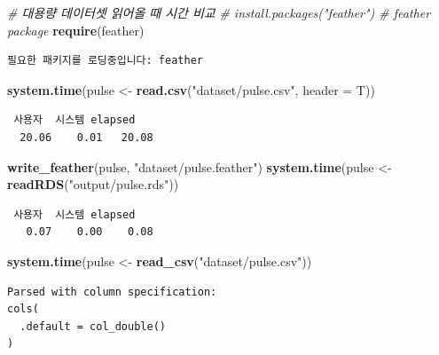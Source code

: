 \documentclass[
  11pt,
]{krantz}
\newenvironment{Shaded}{\begin{snugshade}}{\end{snugshade}}
\newcommand{\CommentTok}[1]{\textcolor[rgb]{0.37,0.37,0.37}{\textit{#1}}}
\newcommand{\DataTypeTok}[1]{\textcolor[rgb]{0.27,0.27,0.27}{#1}}
\newcommand{\KeywordTok}[1]{\textcolor[rgb]{0.27,0.27,0.27}{\textbf{#1}}}
\newcommand{\NormalTok}[1]{#1}
\newcommand{\StringTok}[1]{\textcolor[rgb]{0.5,0.5,0.5}{#1}}
\begin{document}
\begin{Shaded}
\begin{Highlighting}[]
\CommentTok{# 대용량 데이터셋 읽어올 때 시간 비교}
\CommentTok{# install.packages("feather") # feather package}
\KeywordTok{require}\NormalTok{(feather)}
\end{Highlighting}
\end{Shaded}

\begin{verbatim}
필요한 패키지를 로딩중입니다: feather
\end{verbatim}

\begin{Shaded}
\begin{Highlighting}[]
\KeywordTok{system.time}\NormalTok{(pulse <-}\StringTok{ }\KeywordTok{read.csv}\NormalTok{(}\StringTok{"dataset/pulse.csv"}\NormalTok{, }\DataTypeTok{header =}\NormalTok{ T))}
\end{Highlighting}
\end{Shaded}

\begin{verbatim}
 사용자  시스템 elapsed 
  20.06    0.01   20.08 
\end{verbatim}

\begin{Shaded}
\begin{Highlighting}[]
\KeywordTok{write_feather}\NormalTok{(pulse, }\StringTok{"dataset/pulse.feather"}\NormalTok{)}
\KeywordTok{system.time}\NormalTok{(pulse <-}\StringTok{ }\KeywordTok{readRDS}\NormalTok{(}\StringTok{"output/pulse.rds"}\NormalTok{))}
\end{Highlighting}
\end{Shaded}

\begin{verbatim}
 사용자  시스템 elapsed 
   0.07    0.00    0.08 
\end{verbatim}

\begin{Shaded}
\begin{Highlighting}[]
\KeywordTok{system.time}\NormalTok{(pulse <-}\StringTok{ }\KeywordTok{read_csv}\NormalTok{(}\StringTok{"dataset/pulse.csv"}\NormalTok{))}
\end{Highlighting}
\end{Shaded}

\begin{verbatim}
Parsed with column specification:
cols(
  .default = col_double()
)
\end{verbatim}
\end{document}
